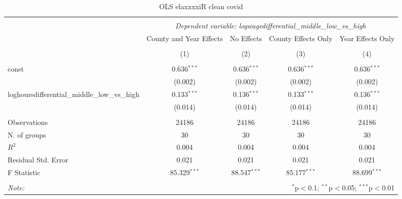 \documentclass{report}
\begin{document}
\begin{table}[!htbp] \centering
  \caption{OLS elaxxxxiR clean covid}
\begin{tabular}{@{\extracolsep{5pt}}lcccc}
\\[-1.8ex]\hline
\hline \\[-1.8ex]
& \multicolumn{4}{c}{\textit{Dependent variable: logwagedifferential_middle_low_vs_high}} \
\cr \cline{2-5}
\\[-1.8ex] & \multicolumn{1}{c}{County and Year Effects} & \multicolumn{1}{c}{No Effects} & \multicolumn{1}{c}{County Effects Only} & \multicolumn{1}{c}{Year Effects Only}  \\
\\[-1.8ex] & (1) & (2) & (3) & (4) \\
\hline \\[-1.8ex]
 const & 0.636$^{***}$ & 0.636$^{***}$ & 0.636$^{***}$ & 0.636$^{***}$ \\
& (0.002) & (0.002) & (0.002) & (0.002) \\
 loghoursdifferential_middle_low_vs_high & 0.133$^{***}$ & 0.136$^{***}$ & 0.133$^{***}$ & 0.136$^{***}$ \\
& (0.014) & (0.014) & (0.014) & (0.014) \\
\hline \\[-1.8ex]
 Observations & 24186 & 24186 & 24186 & 24186 \\
 N. of groups & 30 & 30 & 30 & 30 \\
 $R^2$ & 0.004 & 0.004 & 0.004 & 0.004 \\
 Residual Std. Error & 0.021 & 0.021 & 0.021 & 0.021 \\
 F Statistic & 85.329$^{***}$ & 88.547$^{***}$ & 85.177$^{***}$ & 88.699$^{***}$ \\
\hline
\hline \\[-1.8ex]
\textit{Note:} & \multicolumn{4}{r}{$^{*}$p$<$0.1; $^{**}$p$<$0.05; $^{***}$p$<$0.01} \\
\end{tabular}
\end{table}
\end{document}
